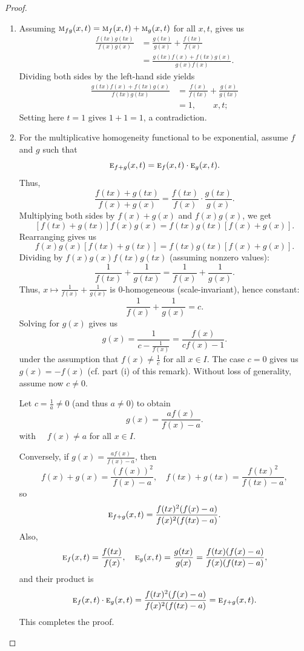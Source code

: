 \documentclass{amsart}
\theoremstyle{plain}
\numberwithin{equation}{section}
\newcommand{\mh}{\textsc{m}}
\newcommand{\eh}{\textsc{e}}
\begin{document}
\begin{proof}
\begin{enumerate}
 \item
 Assuming $\mh_{fg}(x,t) = \mh_{f}(x,t)+ \mh_{g}(x,t)$
 for all $x, t$,
 gives us
 \begin{align*}
\frac{f(tx) g(tx)}{f(x) g(x)}
&=
\frac{g(tx)}{g(x)}+ \frac{f(tx)}{f(x)}\\
 &=
 \frac{ g(tx)f(x) +  f(tx)g(x)}{g(x) f(x)}.
\end{align*}
Dividing both sides by the left-hand side yields
 \begin{align*}
 \frac{ g(tx)f(x) +  f(tx)g(x)}{f(tx) g(tx)} 
 &=
 \frac{f(x)}{f(tx)} +
 \frac{g(x)}{g(tx)}\\
&=
1,
\qquad x,t;
\end{align*}
Setting here $t=1$ gives $1+1=1$, a contradiction.
  \item 
For the multiplicative homogeneity functional to be exponential,
assume \( f \) and \( g \) such that
\begin{equation} \label{eq:main}
\eh_{f+g}(x, t) = \eh_f(x, t) \cdot \eh_g(x, t).
\end{equation}
Thus,
\[
\frac{f(tx) + g(tx)}{f(x) + g(x)} = \frac{f(tx)}{f(x)} \cdot \frac{g(tx)}{g(x)}.
\]
Multiplying both sides by \( f(x) + g(x) \) and \( f(x) g(x) \), we get
\[
[f(tx) + g(tx)] f(x) g(x) = f(tx) g(tx) [f(x) + g(x)].
\]
Rearranging gives us
\[
f(x) g(x) [f(tx) + g(tx)] = f(tx) g(tx) [f(x) + g(x)].
\]
Dividing by \( f(x) g(x) f(tx) g(tx) \) (assuming nonzero values):
\[
\frac{1}{f(tx)} + \frac{1}{g(tx)} = \frac{1}{f(x)} + \frac{1}{g(x)}.
\]
Thus, \( x \mapsto \frac{1}{f(x)} + \frac{1}{g(x)} \) is $0$-homogeneous 
(scale-invariant), hence constant:
\[
\frac{1}{f(x)} + \frac{1}{g(x)} = c.
\]
Solving for \( g(x) \) gives us
\[
g(x) = \frac{1}{c - \frac{1}{f(x)}} = \frac{f(x)}{c f(x) - 1}.
\]
under the assumption that $f(x) \neq \frac{1}{c}$ for all $x \in I$.
The case $c=0$ gives us $g(x)=-f(x)$ (cf. part (i) of this remark).
Without loss of generality, assume now $c \neq 0$.


Let \( c = \frac{1}{a} \neq 0 \) (and thus $a \neq 0$) to obtain
\[
g(x) = \frac{a f(x)}{f(x) - a}.
\]
with $\quad f(x) \neq a$ for all $x \in I$.

Conversely, if \( g(x) = \frac{a f(x)}{f(x) - a} \), then
\[
f(x) + g(x) = \frac{(f(x))^2}{f(x) - a}, \quad
f(tx) + g(tx) = \frac{f(tx)^2}{f(tx) - a},
\]
so
\[
\eh_{f+g}(x, t) = \frac{f(tx)^2 (f(x) - a)}{f(x)^2 (f(tx) - a)}.
\]
Also,
\[
\eh_f(x, t) = \frac{f(tx)}{f(x)}, \quad
\eh_g(x, t) = \frac{g(tx)}{g(x)} = \frac{f(tx) (f(x) - a)}{f(x) (f(tx) - a)},
\]
and their product is
\[
\eh_f(x, t) \cdot \eh_g(x, t) = \frac{f(tx)^2 (f(x) - a)}{f(x)^2 (f(tx) - a)} = \eh_{f+g}(x, t).
\]
This completes the proof.
\end{enumerate}
\end{proof}
\end{document}
